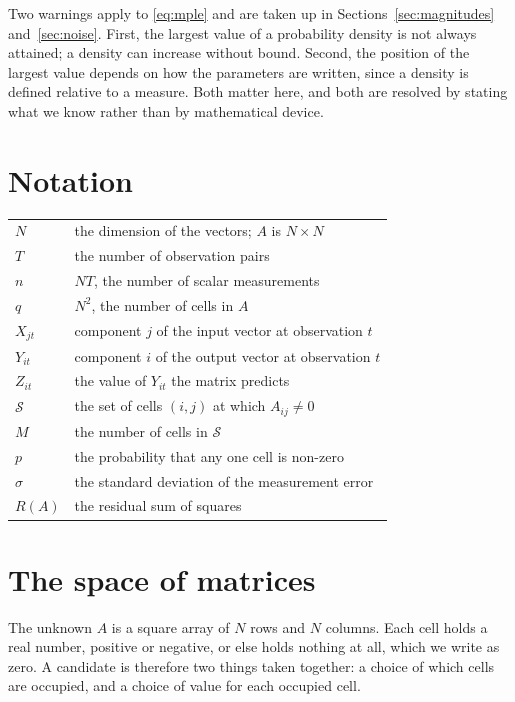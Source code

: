 Two warnings apply to \eqref{eq:mple} and are taken up in
Sections~\ref{sec:magnitudes} and~\ref{sec:noise}. First, the largest value of a
probability density is not always attained; a density can increase without bound.
Second, the position of the largest value depends on how the parameters are written,
since a density is defined relative to a measure. Both matter here, and both are
resolved by stating what we know rather than by mathematical device.

\section{Notation}

\begin{center}
\begin{tabular}{ll}
$N$ & the dimension of the vectors; $A$ is $N \times N$ \\
$T$ & the number of observation pairs \\
$n$ & $NT$, the number of scalar measurements \\
$q$ & $N^2$, the number of cells in $A$ \\
$X_{jt}$ & component $j$ of the input vector at observation $t$ \\
$Y_{it}$ & component $i$ of the output vector at observation $t$ \\
$Z_{it}$ & the value of $Y_{it}$ the matrix predicts \\
$\mathcal{S}$ & the set of cells $(i,j)$ at which $A_{ij} \neq 0$ \\
$M$ & the number of cells in $\mathcal{S}$ \\
$p$ & the probability that any one cell is non-zero \\
$\sigma$ & the standard deviation of the measurement error \\
$R(A)$ & the residual sum of squares \\
\end{tabular}
\end{center}

\section{The space of matrices}
\label{sec:matrixspace}

The unknown $A$ is a square array of $N$ rows and $N$ columns. Each cell holds a real
number, positive or negative, or else holds nothing at all, which we write as zero.
A candidate is therefore two things taken together: a choice of which cells are
occupied, and a choice of value for each occupied cell.

